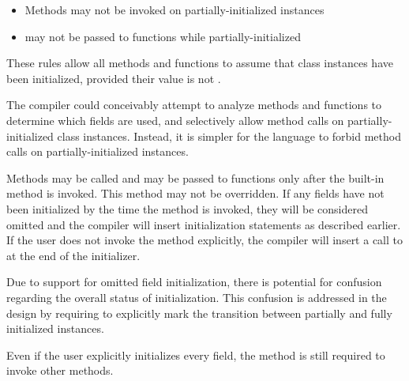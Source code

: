 \begin{itemize}
\item Methods may not be invoked on partially-initialized instances
\item {} may not be passed to functions while partially-initialized
\end{itemize}

These rules allow all methods and functions to assume that class instances
have been initialized, provided their value is not .

\begin{rationale}
  The compiler could conceivably attempt to analyze methods and functions to
  determine which fields are used, and selectively allow method calls on
  partially-initialized class instances. Instead, it is simpler for the
  language to forbid method calls on partially-initialized instances.
\end{rationale}

Methods may be called and  may be passed to functions only after the
built-in  method is invoked. This method may not be overridden.
If any fields have not been initialized by the time the  method
is invoked, they will be considered omitted and the compiler will insert
initialization statements as described earlier. If the user does not invoke the
 method explicitly, the compiler will insert a call to
 at the end of the initializer.

\begin{rationale}
Due to support for omitted field initialization, there is potential for
confusion regarding the overall status of initialization. This confusion is
addressed in the design by requiring  to explicitly mark the
transition between partially and fully initialized instances.
\end{rationale}

\begin{note}
Even if the user explicitly initializes every field, the  method
is still required to invoke other methods.
\end{note}

